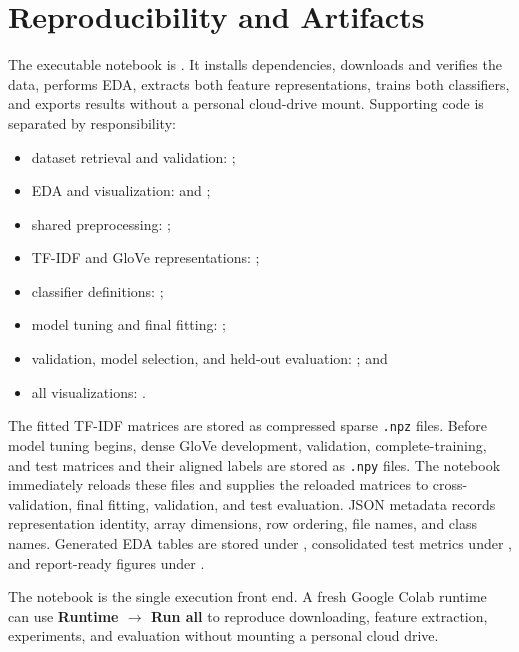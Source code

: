 \section{Reproducibility and Artifacts}
\label{sec:reproducibility}

The executable notebook is . It installs dependencies, 
downloads and verifies the data, performs EDA, extracts both feature representations, 
trains both classifiers, and exports results without a personal cloud-drive mount. 
Supporting code is separated by responsibility:

\begin{itemize}
  \item dataset retrieval and validation: ;
  \item EDA and visualization:  and ;
  \item shared preprocessing: ;
  \item TF-IDF and GloVe representations: ;
  \item classifier definitions: ;
  \item model tuning and final fitting: ;
  \item validation, model selection, and held-out evaluation: ; and
  \item all visualizations: .
\end{itemize}

The fitted TF-IDF matrices are stored as compressed sparse \texttt{.npz} files. Before model
tuning begins, dense GloVe development, validation, complete-training, and test matrices and
their aligned labels are stored as \texttt{.npy} files. The notebook immediately reloads these
files and supplies the reloaded matrices to cross-validation, final fitting, validation, and
test evaluation. JSON metadata records representation identity, array dimensions, row ordering,
file names, and class names. Generated EDA tables
are stored under , consolidated test metrics 
under , and report-ready figures 
under .

The notebook is the single execution front end. A fresh Google Colab runtime can 
use \textbf{Runtime $\rightarrow$ Run all} to reproduce downloading, feature extraction, 
experiments, and evaluation without mounting a personal cloud drive.
